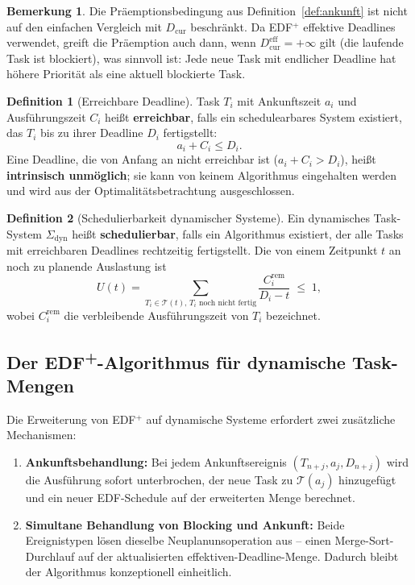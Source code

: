 ﻿\documentclass[a4paper,12pt]{article}
\theoremstyle{definition}
\newtheorem{definition}{Definition}
\newtheorem{bemerkung}{Bemerkung}
\begin{document}
	\begin{bemerkung}
		Die Präemptionsbedingung aus Definition~\ref{def:ankunft} ist nicht auf den
		einfachen Vergleich mit $D_{\mathrm{cur}}$ beschränkt. Da EDF$^+$ effektive
		Deadlines verwendet, greift die Präemption auch dann, wenn
		$D_{\mathrm{cur}}^{\text{eff}} = +\infty$ gilt (die laufende Task ist blockiert),
		was sinnvoll ist: Jede neue Task mit endlicher Deadline hat höhere Priorität
		als eine aktuell blockierte Task.
	\end{bemerkung}

	\begin{definition}[Erreichbare Deadline]
		Task $T_i$ mit Ankunftszeit $a_i$ und Ausführungszeit $C_i$ hei\ss{}t
		\textbf{erreichbar}, falls ein schedulearbares System existiert, das $T_i$
		bis zu ihrer Deadline $D_i$ fertigstellt:
		\[
		a_i + C_i \le D_i.
		\]
		Eine Deadline, die von Anfang an nicht erreichbar ist ($a_i + C_i > D_i$),
		hei\ss{}t \textbf{intrinsisch unmöglich}; sie kann von keinem Algorithmus
		eingehalten werden und wird aus der Optimalitätsbetrachtung ausgeschlossen.
	\end{definition}

	\begin{definition}[Schedulierbarkeit dynamischer Systeme]
		\label{def:sched_dyn}
		Ein dynamisches Task-System $\Sigma_{\mathrm{dyn}}$ hei\ss{}t
		\textbf{schedulierbar}, falls ein Algorithmus existiert, der alle Tasks mit
		erreichbaren Deadlines rechtzeitig fertigstellt. Die von einem Zeitpunkt $t$
		an noch zu planende Auslastung ist
		\[
		U(t) = \sum_{T_i \in \mathcal{T}(t),\, T_i \text{ noch nicht fertig}}
		\frac{C_i^{\text{rem}}}{D_i - t} \;\le\; 1,
		\]
		wobei $C_i^{\text{rem}}$ die verbleibende Ausführungszeit von $T_i$ bezeichnet.
	\end{definition}

	\subsection{Der EDF\textsuperscript{+}-Algorithmus für dynamische Task-Mengen}

	Die Erweiterung von EDF$^+$ auf dynamische Systeme erfordert zwei zusätzliche
	Mechanismen:
	\begin{enumerate}
		\item \textbf{Ankunftsbehandlung:} Bei jedem Ankunftsereignis $(T_{n+j}, a_j, D_{n+j})$
		      wird die Ausfüh\-rung sofort unterbrochen, der neue Task zu $\mathcal{T}(a_j)$
		      hinzugefügt und ein neuer EDF-Schedule auf der erweiterten Menge berechnet.
		\item \textbf{Simultane Behandlung von Blocking und Ankunft:} Beide Ereignistypen
		      lösen dieselbe Neuplanunsoperation aus -- einen Merge-Sort-Durchlauf auf
		      der aktualisierten effektiven-Deadline-Menge. Dadurch bleibt der Algorithmus
		      konzeptionell einheitlich.
	\end{enumerate}
\end{document}
